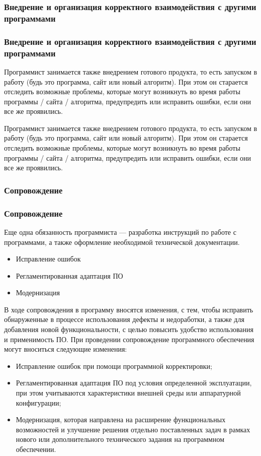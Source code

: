 \documentclass{../industrial-development}
\begin{document}
\subsubsection{Внедрение и организация корректного взаимодействия с другими программами}
\begin{frame} \frametitle{Внедрение и организация корректного взаимодействия с другими программами}
Программист занимается также внедрением готового продукта, то есть запуском в работу (будь это программа, сайт или новый алгоритм). При этом он старается отследить возможные проблемы, которые могут возникнуть во время работы программы / сайта / алгоритма, предупредить или исправить ошибки, если они все же проявились.
\end{frame}
\lecturenotes
Программист занимается также внедрением готового продукта, то есть запуском в работу (будь это программа, сайт или новый алгоритм). При этом он старается отследить возможные проблемы, которые могут возникнуть во время работы программы / сайта / алгоритма, предупредить или исправить ошибки, если они все же проявились.

\subsubsection{Сопровождение}
\begin{frame} \frametitle{Сопровождение}
Еще одна обязанность программиста — разработка инструкций по работе с программами, а также оформление необходимой технической документации.
\vspace{\baselineskip}

\begin{itemize}
	\item Исправление ошибок
	\item Регламентированная адаптация ПО
	\item Модернизация 
\end{itemize}
\end{frame}
\lecturenotes
В ходе сопровождения в программу вносятся изменения, с тем, чтобы исправить обнаруженные в процессе использования дефекты и недоработки, а также для добавления новой функциональности, с целью повысить удобство использования и применимость ПО.
При проведении сопровождение программного обеспечения могут вноситься следующие изменения:\\
\begin{itemize}
\item Исправление ошибок при помощи программной корректировки;
\item Регламентированная адаптация ПО под условия определенной эксплуатации, при этом учитываются характеристики внешней среды или аппаратурной конфигурации; 
\item Модернизация, которая направлена на расширение функциональных возможностей и улучшение решения отдельно поставленных задач в рамках нового или дополнительного технического задания на программном обеспечении.
\end{itemize}
\end{document}
